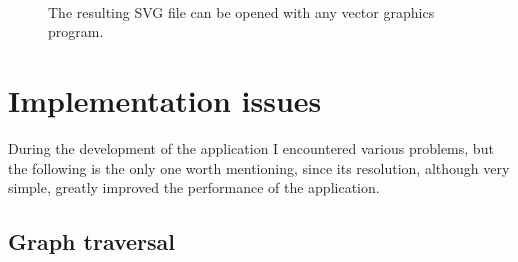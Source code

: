 \documentclass[]{usiinfbachelorproject}
\begin{document}
\begin{figure}[ht]
	\centering
	\\
	\caption{The resulting SVG file can be opened with any vector graphics program.}
	\label{fig:opensvg}
\end{figure}

\section{Implementation issues} \label{sec:issues}

During the development of the application I encountered various problems, but the following is the only one worth mentioning, since its resolution, although very simple, greatly improved the performance of the application.

\subsection{Graph traversal} \label{sec:issuetraverse} 
\end{document}
